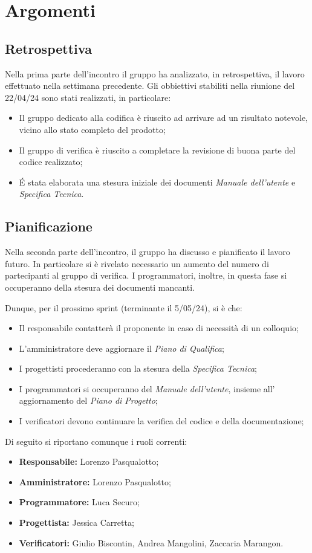 \section{Argomenti}
\subsection{Retrospettiva}
Nella prima parte dell'incontro il gruppo ha analizzato, in retrospettiva, il lavoro effettuato nella settimana precedente.
Gli obbiettivi stabiliti nella riunione del 22/04/24 sono stati realizzati, in particolare:
\begin{itemize}
    \item Il gruppo dedicato alla codifica è riuscito ad arrivare ad un risultato notevole, vicino allo stato completo del prodotto;
    \item Il gruppo di verifica è riuscito a completare la revisione di buona parte del codice realizzato;
    \item  É stata elaborata una stesura iniziale dei documenti \textit{Manuale dell'utente} e \textit{Specifica Tecnica}.
\end{itemize}



\subsection{Pianificazione}
\noindent Nella seconda parte dell'incontro, il gruppo ha discusso e pianificato il lavoro futuro. In particolare si è rivelato necessario un aumento del numero di partecipanti al gruppo di verifica. I programmatori, inoltre, in questa fase si occuperanno della stesura dei documenti mancanti.
\bigskip

\noindent Dunque, per il prossimo sprint (terminante il 5/05/24), si è che:
\begin{itemize}
    \item Il responsabile contatterà il proponente in caso di necessità di un colloquio;
    \item L'amministratore deve aggiornare il  \textit{Piano di Qualifica};
    \item I progettisti procederanno con la stesura della \textit{Specifica Tecnica};
    \item I programmatori si occuperanno del \textit{Manuale dell'utente}, insieme all' aggiornamento del \textit{Piano di Progetto};
    \item I verificatori devono continuare la verifica del codice e della documentazione;
\end{itemize}
\bigskip

Di seguito si riportano comunque i ruoli correnti:
\begin{itemize}
    \item \textbf{Responsabile:} Lorenzo Pasqualotto;
    \item \textbf{Amministratore:} Lorenzo Pasqualotto;
    \item \textbf{Programmatore:} Luca Securo;
    \item \textbf{Progettista:} Jessica Carretta;
    \item \textbf{Verificatori:} Giulio Biscontin, Andrea Mangolini, Zaccaria Marangon.
\end{itemize}